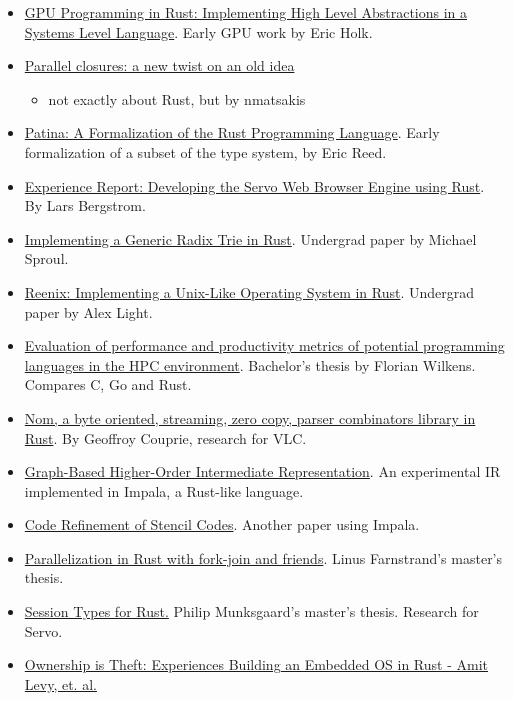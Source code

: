 \begin{itemize}
  \item{\href{http://www.cs.indiana.edu/\%7Eeholk/papers/hips2013.pdf}{GPU Programming in Rust: Implementing High Level 
          Abstractions in a Systems Level Language}. Early GPU work by Eric Holk.}
  \item{\href{https://www.usenix.org/conference/hotpar12/parallel-closures-new-twist-old-idea}{Parallel closures: a new 
          twist on an old idea}}
  \begin{itemize}
    \item{not exactly about Rust, but by nmatsakis}
  \end{itemize}
  \item{\href{ftp://ftp.cs.washington.edu/tr/2015/03/UW-CSE-15-03-02.pdf}{Patina: A Formalization of the Rust Programming Language}.
          Early formalization of a subset of the type system, by Eric Reed.}
  \item{\href{http://arxiv.org/abs/1505.07383}{Experience Report: Developing the Servo Web Browser Engine using Rust}. 
          By Lars Bergstrom.}
  \item{\href{https://michaelsproul.github.io/rust\_radix\_paper/rust-radix-sproul.pdf}{Implementing a Generic Radix Trie 
          in Rust}. Undergrad paper by Michael Sproul.}
  \item{\href{http://scialex.github.io/reenix.pdf}{Reenix: Implementing a Unix-Like Operating System in Rust}. 
          Undergrad paper by Alex Light.}
  \item{\href{http://octarineparrot.com/assets/mrfloya-thesis-ba.pdf}{Evaluation of performance and productivity metrics of 
          potential programming languages in the HPC environment}. Bachelor's thesis by Florian Wilkens. Compares C, Go and Rust.}
  \item{\href{http://spw15.langsec.org/papers/couprie-nom.pdf}{Nom, a byte oriented, streaming, zero copy, parser combinators 
          library in Rust}. By Geoffroy Couprie, research for VLC.}
  \item{\href{http://compilers.cs.uni-saarland.de/papers/lkh15\_cgo.pdf}{Graph-Based Higher-Order Intermediate Representation}. 
          An experimental IR implemented in Impala, a Rust-like language.}
  \item{\href{http://compilers.cs.uni-saarland.de/papers/ppl14_web.pdf}{Code Refinement of Stencil Codes}. Another paper using 
          Impala.}
  \item{\href{http://publications.lib.chalmers.se/records/fulltext/219016/219016.pdf}{Parallelization in Rust with fork-join 
          and friends}. Linus Farnstrand's master's thesis.}
  \item{\href{http://munksgaard.me/papers/laumann-munksgaard-larsen.pdf}{Session Types for Rust.} 
          Philip Munksgaard's master's thesis. Research for Servo.}
  \item{\href{http://amitlevy.com/papers/tock-plos2015.pdf}{Ownership is Theft: Experiences Building an Embedded OS in Rust - 
          Amit Levy, et. al.}}
\end{itemize}
